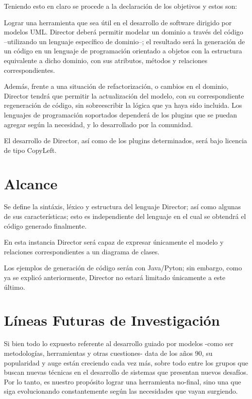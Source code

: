 Teniendo esto en claro se procede a la declaración de los objetivos y estos
son:

Lograr una herramienta que sea útil en el desarrollo de software dirigido por
modelos UML.
Director deberá permitir modelar un dominio a través del código --utilizando un
lenguaje específico de dominio--; el resultado será la generación de un código en
un lenguaje de programación orientado a objetos con la estructura equivalente a
dicho dominio, con sus atributos, métodos y relaciones correspondientes.

Además, frente a una situación de refactorización, o cambios en el dominio,
Director tendrá que permitir la actualización del modelo, con su correspondiente
regeneración de código, sin sobreescribir la lógica que ya haya sido incluida.
Los lenguajes de programación soportados dependerá de los plugins que se puedan
agregar según la necesidad, y lo desarrollado por la comunidad.

El desarrollo de Director, así como de los plugins determinados, será bajo
licencia de tipo CopyLeft.

\section{Alcance}%
\label{sec:alcance}
Se define la sintáxis, léxico y estructura del lenguaje Director; así como algunas
de sus características; esto es independiente del lenguaje en el cual se obtendrá el
código generado finalmente.

En esta instancia Director será capaz de expresar únicamente el modelo y relaciones
correspondientes a un diagrama de clases.

Los ejemplos de generación de código serán con Java/Pyton; sin embargo, como ya se
explicó anteriormente, Director no estará limitado únicamente a este último.

\section{Líneas Futuras de Investigación}%
\label{sec:lineas_futuras_de_investigacion}
Si bien todo lo expuesto referente al desarrollo guiado por modelos -como ser metodologías,
herramientas y otras cuestiones- data de los años 90, su popularidad y auge están creciendo
cada vez más, sobre todo entre los grupos que buscan nuevas técnicas en el desarrollo de sistemas
que presentan nuevos desafíos. Por lo tanto, es nuestro propósito lograr una herramienta no-final,
sino una que siga evolucionando constantemente según las necesidades que vayan surgiendo.

